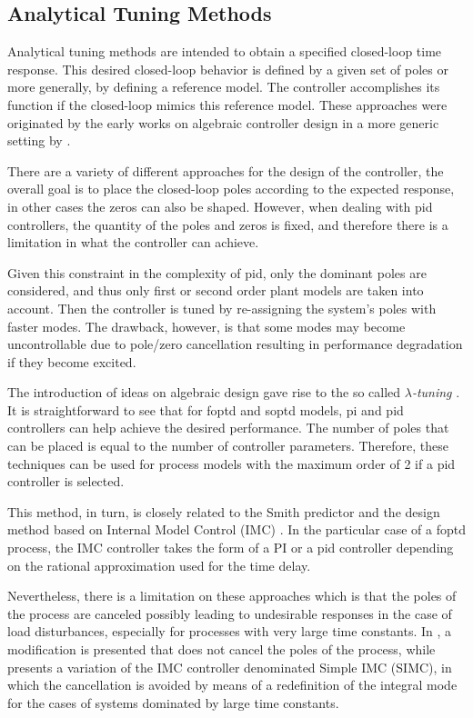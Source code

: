 \subsection{Analytical Tuning Methods}

Analytical tuning methods are intended to obtain a specified closed-loop time response. This desired closed-loop behavior is defined by a given set of poles or more generally, by defining a reference model. The controller accomplishes its function if the closed-loop mimics this reference model. These approaches were originated by the early works on algebraic controller design in a more generic setting by \citet{ragazzini1958}.

There are a variety of different approaches for the design of the controller, the overall goal is to place the closed-loop poles according to the expected response, in other cases the zeros can also be shaped. However, when dealing with \gls{pid} controllers, the quantity of the poles and zeros is fixed, and therefore there is a limitation in what the controller can achieve.

Given this constraint in the complexity of \gls{pid}, only the dominant poles are considered, and thus only first or second order plant models are taken into account. Then the controller is tuned by re-assigning the system's poles with faster modes. The drawback, however, is that some modes may become uncontrollable due to pole/zero cancellation resulting in performance degradation if they become excited.

The introduction of ideas on algebraic design gave rise to the so called \emph{$\lambda$-tuning} \citep{dahlin68}. It is straightforward to see that for \gls{foptd} and  \gls{soptd} models, \gls{pi} and \gls{pid}
controllers can help achieve the desired performance. The number of poles that can be placed is equal to the number of controller parameters. Therefore, these techniques can be used for process models with the maximum order of 2 if a \gls{pid} controller is selected.

This method, in turn, is closely related to the Smith predictor and the design method based on Internal Model Control (IMC) \citep{riveraetall86}.  In the particular case of a \gls{foptd} process, the IMC controller takes the form of a PI or a \gls{pid} controller depending on the rational approximation used for the time delay.

Nevertheless, there is a limitation on these approaches which is that the poles of the process are canceled possibly leading to undesirable responses in the case of load disturbances, especially for processes with very large time constants. In \citet{chien90}, a modification is presented  that does not cancel the poles of the process, while \citet{Skogestad2003} presents a variation of the IMC controller denominated Simple IMC (SIMC), in which the cancellation is avoided by means of a redefinition of the integral mode for the cases of systems dominated by large time constants.

